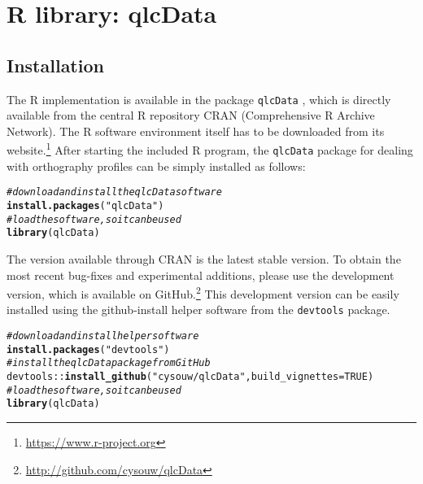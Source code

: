 \documentclass[output=book,nonflat,modfonts,
citecolor=brown,
		]{langsci/langscibook}\usepackage[]{graphicx}\usepackage[]{color}
\makeatletter
\newcommand{\hlnum}[1]{\textcolor[rgb]{0.686,0.059,0.569}{#1}}%
\newcommand{\hlstr}[1]{\textcolor[rgb]{0.192,0.494,0.8}{#1}}%
\newcommand{\hlcom}[1]{\textcolor[rgb]{0.678,0.584,0.686}{\textit{#1}}}%
\newcommand{\hlopt}[1]{\textcolor[rgb]{0,0,0}{#1}}%
\newcommand{\hlstd}[1]{\textcolor[rgb]{0.345,0.345,0.345}{#1}}%
\newcommand{\hlkwc}[1]{\textcolor[rgb]{0.333,0.667,0.333}{#1}}%
\newcommand{\hlkwd}[1]{\textcolor[rgb]{0.737,0.353,0.396}{\textbf{#1}}}%
\newenvironment{kframe}{%
 \def\at@end@of@kframe{}%
 \ifinner\ifhmode%
  \def\at@end@of@kframe{\end{minipage}}%
  \begin{minipage}{\columnwidth}%
 \fi\fi%
 \def\FrameCommand##1{\hskip\@totalleftmargin \hskip-\fboxsep
 \colorbox{shadecolor}{##1}\hskip-\fboxsep
     \hskip-\linewidth \hskip-\@totalleftmargin \hskip\columnwidth}%
 \MakeFramed {\advance\hsize-\width
   \@totalleftmargin\z@ \linewidth\hsize
   \@setminipage}}%
 {\par\unskip\endMakeFramed%
 \at@end@of@kframe}
\newenvironment{knitrout}{}{} %
\makeatother
\begin{document}
\section{R library: qlcData}
\label{r-implementation}

\subsection*{Installation}

The R implementation is available in the package \texttt{qlcData} \citep{Cysouw2018}, which is 
directly available from the central R repository CRAN (Comprehensive R Archive 
Network). The R software environment itself has to be downloaded from its 
website.\footnote{\url{https://www.r-project.org}} After starting the included 
R program, the \texttt{qlcData} package for dealing with orthography profiles can be 
simply installed as follows:

\begin{knitrout}\footnotesize
{}\color{fgcolor}\begin{kframe}
\begin{alltt}
\hlcom{# download and install the qlcData software}
\hlkwd{install.packages}\hlstd{(}\hlstr{"qlcData"}\hlstd{)}
\hlcom{# load the software, so it can be used}
\hlkwd{library}\hlstd{(qlcData)}
\end{alltt}
\end{kframe}
\end{knitrout}

The version available through CRAN is the latest stable version.
To obtain the most recent bug-fixes and experimental additions, please use the
development version, which is available on
GitHub.\footnote{\url{http://github.com/cysouw/qlcData}} This development
version can be easily installed using the github-install helper software from the
\texttt{devtools} package.

\begin{knitrout}\footnotesize
{}\color{fgcolor}\begin{kframe}
\begin{alltt}
\hlcom{# download and install helper software}
\hlkwd{install.packages}\hlstd{(}\hlstr{"devtools"}\hlstd{)}
\hlcom{# install the qlcData package from GitHub}
\hlstd{devtools}\hlopt{::}\hlkwd{install_github}\hlstd{(}\hlstr{"cysouw/qlcData"}\hlstd{,} \hlkwc{build_vignettes} \hlstd{=} \hlnum{TRUE}\hlstd{)}
\hlcom{# load the software, so it can be used}
\hlkwd{library}\hlstd{(qlcData)}
\end{alltt}
\end{kframe}
\end{knitrout}
\end{document}
